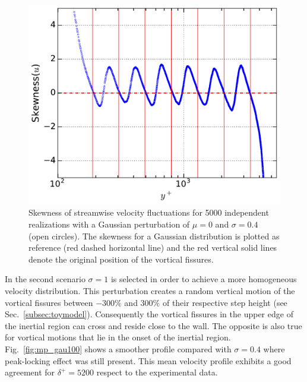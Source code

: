 \documentclass[aps,reprint,amsmath,amssymb,pra]{revtex4-1}%
\begin{document}
\begin{figure}[tb]
\includegraphics[scale=0.46]{figures/skewness_5000_assembles}
\caption{\label{fig:skewgaus} Skewness of streamwise velocity fluctuations for 5000 independent realizations with a Gaussian perturbation of $\mu=0$ and $\sigma=0.4$ (open circles). The skewness for a Gaussian distribution is plotted as reference (red dashed horizontal line) and the red vertical solid lines denote the original position of the vortical fissures.}
\end{figure}
In the second scenario $\sigma=1$ is selected in order to achieve a more homogeneous velocity distribution. This perturbation creates a random vertical motion of the vortical fissures between $-300\%$ and $300\%$ of their respective step height (see Sec.~\ref{subsec:toymodel}). Consequently the vortical fissures in the upper edge of the inertial region can cross and reside close to the wall. The opposite is also true for vortical motions that lie in the onset of the inertial region. Fig.~\ref{fig:mp_gau100} shows a smoother profile compared with $\sigma=0.4$ where peak-locking effect was still present. This mean velocity profile exhibits a good agreement for $\delta^+=5200$ respect to the experimental data. 
\end{document}
